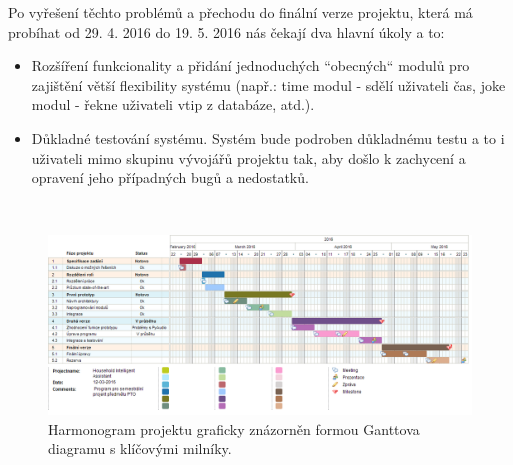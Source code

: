 \documentclass[12pt,a4paper]{article}
\begin{document}
Po vyřešení těchto problémů a přechodu do finální verze projektu, která má probíhat od 29. 4. 2016 do 19. 5. 2016 nás čekají dva hlavní úkoly a to: 
\begin{itemize}
	\item Rozšíření funkcionality a přidání jednoduchých “obecných“ modulů pro zajištění větší flexibility systému (např.: time modul - sdělí uživateli čas, joke modul - řekne uživateli vtip z databáze, atd.).
	\item Důkladné testování systému. Systém bude podroben důkladnému testu a to i uživateli mimo skupinu vývojářů projektu tak, aby došlo k zachycení a opravení jeho případných bugů a nedostatků.
\end{itemize}

\begin{landscape}
~\vfill
\begin{figure}[ht]
	\begin{center}
	\includegraphics[height = 0.6\textheight ]{PTO-Gantt.png}
	\caption{Harmonogram projektu graficky znázorněn formou Ganttova diagramu s klíčovými milníky.}
	\label{fig:diagram gantt}
	\end{center}
\end{figure}
\vfill
\end{landscape}
\end{document}
